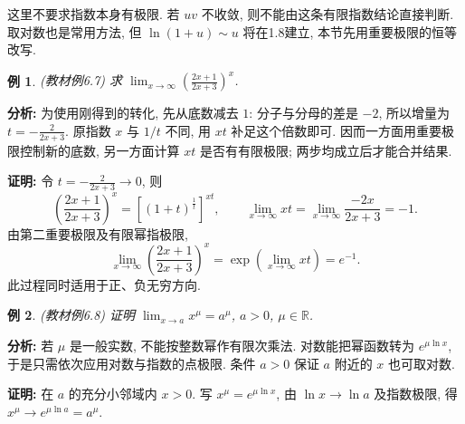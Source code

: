 \documentclass[UTF8,openany]{ctexbook}
\theoremstyle{chinesetextbook}
\newtheorem{example}{例}[section]
\newenvironment{cnproof}{\par\indent\textbf{证明:} \ignorespaces}{\par}
\begin{document}
这里不要求指数本身有极限. 若 $uv$ 不收敛, 则不能由这条有限指数结论直接判断. 取对数也是常用方法, 但 $\ln(1+u)\sim u$ 将在1.8建立, 本节先用重要极限的恒等改写.
\begin{example}
(教材例6.7) 求 $\displaystyle \lim_{x\to\infty}(\frac{2x+1}{2x+3})^x$.
\end{example}
\par\indent\textbf{分析:} 为使用刚得到的转化, 先从底数减去 $1$: 分子与分母的差是 $-2$, 所以增量为 $\displaystyle t=-\frac2{2x+3}$. 原指数 $x$ 与 $\displaystyle1/t$ 不同, 用 $xt$ 补足这个倍数即可. 因而一方面用重要极限控制新的底数, 另一方面计算 $xt$ 是否有有限极限; 两步均成立后才能合并结果.
\begin{cnproof}
令 $\displaystyle t=-\frac2{2x+3}\to0$, 则
\[
\left(\frac{2x+1}{2x+3}\right)^x
=\left[(1+t)^{\frac1t}\right]^{xt},
\qquad \lim_{x\to\infty}xt=\lim_{x\to\infty}\frac{-2x}{2x+3}=-1.
\]
由第二重要极限及有限幂指极限,
\[
\lim_{x\to\infty}\left(\frac{2x+1}{2x+3}\right)^x
=\exp\left(\lim_{x\to\infty}xt\right)=e^{-1}.
\]
此过程同时适用于正、负无穷方向.
\end{cnproof}
\begin{example}
(教材例6.8) 证明 $\displaystyle \lim_{x\to a}x^\mu=a^\mu$, $a>0$, $\mu\in\mathbb R$.
\end{example}
\par\indent\textbf{分析:} 若 $\mu$ 是一般实数, 不能按整数幂作有限次乘法. 对数能把幂函数转为 $e^{\mu\ln x}$, 于是只需依次应用对数与指数的点极限. 条件 $a>0$ 保证 $a$ 附近的 $x$ 也可取对数.
\begin{cnproof}
在 $a$ 的充分小邻域内 $x>0$. 写 $x^\mu=e^{\mu\ln x}$, 由 $\ln x\to\ln a$ 及指数极限, 得 $x^\mu\to e^{\mu\ln a}=a^\mu$.
\end{cnproof}
\end{document}
